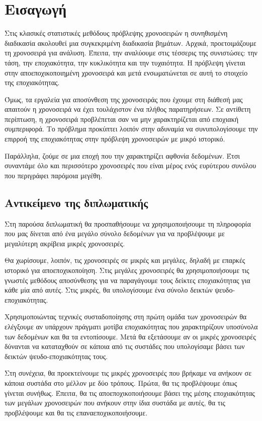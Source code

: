 \chapter{Εισαγωγή}
\label{chap1}

Στις κλασικές στατιστικές μεθόδους πρόβλεψης χρονοσειρών η συνηθισμένη διαδικασία ακολουθεί μια συγκεκριμένη διαδικασία βημάτων. Αρχικά, προετοιμάζουμε τη χρονοσειρά για ανάλυση. Έπειτα, την αναλύουμε στις τέσσερις της συνιστώσες: την τάση, την εποχιακότητα, την κυκλικότητα και την τυχαιότητα. Η πρόβλεψη γίνεται στην αποεποχικοποιημένη χρονοσειρά και μετά ενσωματώνεται σε αυτή το στοιχείο της εποχιακότητας.

Όμως, τα εργαλεία για αποσύνθεση της χρονοσειράς που έχουμε στη διάθεσή μας απαιτούν η χρονοσειρά να έχει τουλάχιστον ένα πλήθος παρατηρήσεων. Σε αντίθετη περίπτωση, η χρονοσειρά προβλέπεται σαν να μην χαρακτηρίζεται από εποχιακή συμπεριφορά. Το πρόβλημα προκύπτει λοιπόν στην αδυναμία να συνυπολογίσουμε την επιρροή της εποχιακότητας στην πρόβλεψη χρονοσειρών με μικρό ιστορικό.

Παράλληλα, ζούμε σε μια εποχή που την χαρακτηρίζει αφθονία δεδομένων. Έτσι συναντάμε όλο και περισσότερο χρονοσειρές που είναι μέρος ενός ευρύτερου συνόλου που περιγράφει παρόμοια μεγέθη.


\section{Αντικείμενο της διπλωματικής}

Στη παρούσα διπλωματική θα προσπαθήσουμε να χρησιμοποιήσουμε τη πληροφορία που μας δίνεται από ένα μεγάλο σύνολο δεδομένων για να προβλέψουμε με μεγαλύτερη ακρίβεια μικρές χρονοσειρές.

Θα χωρίσουμε, λοιπόν, τις χρονοσειρές σε μικρές και μεγάλες, δηλαδή με επαρκές ιστορικό για αποεποχικοποίηση. Στις μεγάλες χρονοσειρές θα χρησιμοποιήσουμε τις γνωστές μεθόδους αποσύνθεσης για να παραγάγουμε τους δείκτες εποχιακότητας για κάθε μία από αυτές. Στις μικρές, θα υπολογίσουμε ένα σύνολο δεικτών ψευδο-εποχιακότητας.

Χρησιμοποιώντας τεχνικές συσταδοποίησης στη πρώτη ομάδα των χρονοσειρών θα ελέγξουμε αν υπάρχουν πράγματι μοτίβα εποχιακότητας που χαρακτηρίζουν υποσύνολα των δεδομένων και θα τα εντοπίσουμε. Μετά θα εξετάσουμε αν οι μικρές χρονοσειρές δύνανται να καταταχθούν σε κάποια από τις συστάδες που υπολογίσαμε βάσει των δεικτών ψευδο-εποχιακότητας τους.

Στη συνέχεια, θα προεκτείνουμε τις μικρές χρονοσειρές που βρήκαμε να ανήκουν σε κάποια συστάδα στο μέλλον με δύο τρόπους. Πρώτα, θα τις προβλέψουμε όπως γίνεται συνήθως. Έπειτα, θα τις αποεποχικοποιήσουμε βάσει της μέσης εποχιακότητας των μεγάλων χρονοσειρών που ανήκουν στην ίδια συστάδα με αυτές, θα τις προβλέψουμε και θα τις επαναεποχικοποιήσουμε.


